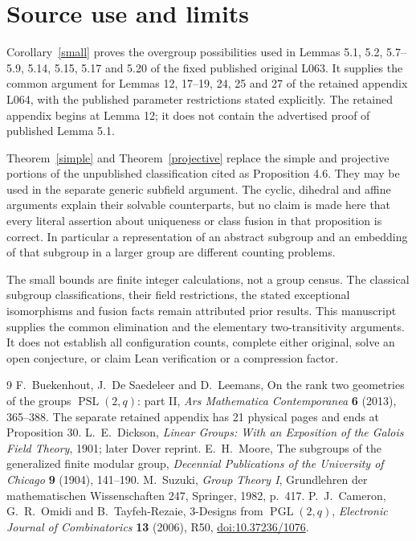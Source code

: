 \documentclass[11pt]{article}
\newcommand{\PSL}{\operatorname{PSL}}
\newcommand{\PGL}{\operatorname{PGL}}
\begin{document}
\section{Source use and limits}
Corollary~\ref{small} proves the overgroup possibilities used
in Lemmas 5.1, 5.2, 5.7--5.9, 5.14, 5.15, 5.17 and 5.20
of the fixed published original L063. It supplies the common
argument for Lemmas 12, 17--19, 24, 25 and 27 of the retained
appendix L064, with the published parameter restrictions stated
explicitly. The retained appendix begins at Lemma 12; it does
not contain the advertised proof of published Lemma 5.1.

Theorem~\ref{simple} and Theorem~\ref{projective} replace the
simple and projective portions of the unpublished classification
cited as Proposition 4.6. They may be used in the separate
generic subfield argument. The cyclic, dihedral and affine
arguments explain their solvable counterparts, but no claim is
made here that every literal assertion about uniqueness or class
fusion in that proposition is correct. In particular a
representation of an abstract subgroup and an embedding of that
subgroup in a larger group are different counting problems.

The small bounds are finite integer calculations, not a group
census. The classical subgroup classifications, their field
restrictions, the stated exceptional isomorphisms and fusion facts
remain attributed prior results. This manuscript supplies the
common elimination and the elementary two-transitivity arguments.
It does not establish all configuration counts, complete either
original, solve an open conjecture, or claim Lean verification
or a compression factor.
\begin{thebibliography}{9}
 F.~Buekenhout, J.~De Saedeleer and D.~Leemans,
On the rank two geometries of the groups $\PSL(2,q)$: part II,
\emph{Ars Mathematica Contemporanea} \textbf{6} (2013), 365--388.
The separate retained appendix has 21 physical pages and ends at
Proposition 30.
 L.~E.~Dickson, \emph{Linear Groups: With an
Exposition of the Galois Field Theory}, 1901; later Dover reprint.
 E.~H.~Moore, The subgroups of the generalized
finite modular group, \emph{Decennial Publications of the
University of Chicago} \textbf{9} (1904), 141--190.
 M.~Suzuki, \emph{Group Theory I}, Grundlehren
der mathematischen Wissenschaften 247, Springer, 1982, p.~417.
 P.~J.~Cameron, G.~R.~Omidi and B.~Tayfeh-Rezaie,
$3$-Designs from $\PGL(2,q)$, \emph{Electronic Journal of
Combinatorics} \textbf{13} (2006), R50,
\href{https://doi.org/10.37236/1076}{doi:10.37236/1076}.
\end{thebibliography}
\end{document}
